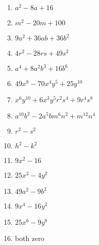 \documentclass[a4paper]{JAC2003}
\begin{document}
\begin{enumerate}
\item $a^{2}-8 a+16$

\item $m^{2}-20 m+100$

\item $9 a^{2}+36 a b+36 b^{2}$

\item $4 r^{2}-28 r s+49 s^{2}$

\item $a^{4}+8 a^{2} b^{3}+16 b^{6}$

\item $49 x^{8}-70 x^{4} y^{5}+25 y^{10}$

\item $x^{6} y^{10}+6 x^{3} y^{5} r^{2} s^{4}+9 r^{4} s^{8}$

\item $a^{10} b^{2}-2 a^{5} b m^{6} n^{2}+m^{12} n^{4}$

\item $r^{2}-s^{2}$

\item $h^{2}-k^{2}$

\item $9 x^{2}-16$

\item $25 x^{2}-4 y^{2}$

\item $49 a^{2}-9 b^{2}$

\item $9 x^{4}-16 y^{2}$

\item $25 x^{6}-9 y^{8}$

\item both zero %
\end{enumerate}
\end{document}
